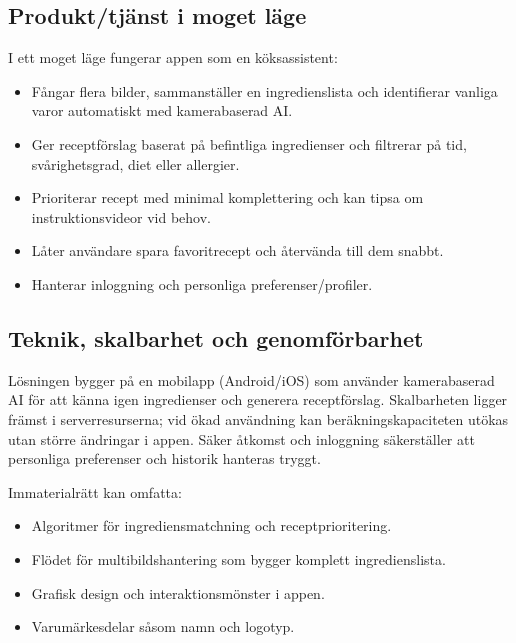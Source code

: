 \documentclass[a4paper,12pt]{article}
\begin{document}
\subsection{Produkt/tjänst i moget läge}
I ett moget läge fungerar appen som en köksassistent:
\begin{itemize}
    \item Fångar flera bilder, sammanställer en ingredienslista och identifierar vanliga varor automatiskt med kamerabaserad AI.
    \item Ger receptförslag baserat på befintliga ingredienser och filtrerar på tid, svårighetsgrad, diet eller allergier.
    \item Prioriterar recept med minimal komplettering och kan tipsa om instruktionsvideor vid behov.
    \item Låter användare spara favoritrecept och återvända till dem snabbt.
    \item Hanterar inloggning och personliga preferenser/profiler.
\end{itemize}


\subsection{Teknik, skalbarhet och genomförbarhet}

Lösningen bygger på en mobilapp (Android/iOS) som använder kamerabaserad AI för att känna igen ingredienser och generera receptförslag. Skalbarheten ligger främst i serverresurserna; vid ökad användning kan beräkningskapaciteten utökas utan större ändringar i appen. Säker åtkomst och inloggning säkerställer att personliga preferenser och historik hanteras tryggt.

Immaterialrätt kan omfatta:
\begin{itemize}
    \item Algoritmer för ingrediensmatchning och receptprioritering.
    \item Flödet för multibildshantering som bygger komplett ingredienslista.
    \item Grafisk design och interaktionsmönster i appen.
    \item Varumärkesdelar såsom namn och logotyp.
\end{itemize}
\end{document}
